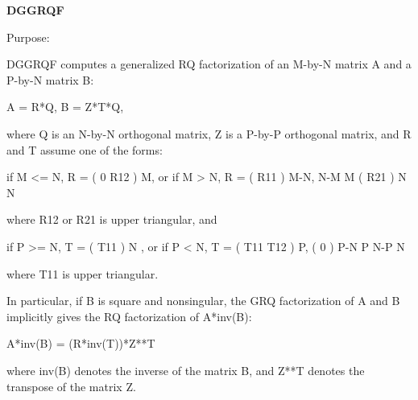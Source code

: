 {\bfseries D\+G\+G\+R\+Q\+F} 

 \begin{DoxyParagraph}{Purpose\+: }
\begin{DoxyVerb} DGGRQF computes a generalized RQ factorization of an M-by-N matrix A
 and a P-by-N matrix B:

             A = R*Q,        B = Z*T*Q,

 where Q is an N-by-N orthogonal matrix, Z is a P-by-P orthogonal
 matrix, and R and T assume one of the forms:

 if M <= N,  R = ( 0  R12 ) M,   or if M > N,  R = ( R11 ) M-N,
                  N-M  M                           ( R21 ) N
                                                      N

 where R12 or R21 is upper triangular, and

 if P >= N,  T = ( T11 ) N  ,   or if P < N,  T = ( T11  T12 ) P,
                 (  0  ) P-N                         P   N-P
                    N

 where T11 is upper triangular.

 In particular, if B is square and nonsingular, the GRQ factorization
 of A and B implicitly gives the RQ factorization of A*inv(B):

              A*inv(B) = (R*inv(T))*Z**T

 where inv(B) denotes the inverse of the matrix B, and Z**T denotes the
 transpose of the matrix Z.\end{DoxyVerb}
 
\end{DoxyParagraph}

